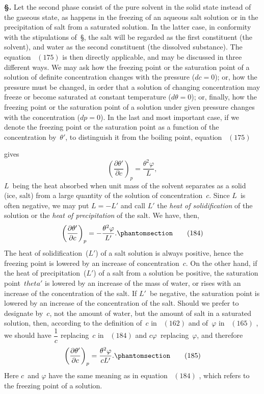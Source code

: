 \documentclass[12pt]{book}[2005/09/16]
\newcommand{\Erratum}[2]{#2}
\newcommand{\Section}[1]{
  \medskip\par\textbf{§\;#1}
  \label{section:#1}
}
\newcommand{\SecRef}[2][§\;]{\hyperref[section:#2.]{{\upshape #1#2}}}
\newcommand{\Tag}[1]{%
  \phantomsection\label{eqn:#1}\tag*{\ensuremath{#1}}%
}
\newcommand{\Eq}[1]{%
  \hyperref[eqn:#1]{\ensuremath{#1}}%
}
\newcommand{\PageSep}[1]{\ignorespaces}
\newcommand{\dd}{\partial}
\begin{document}
\Section{227.} Let the second phase consist of the pure solvent
in the solid state instead of the gaseous state, as happens
in the freezing of an aqueous salt solution or in the precipitation
of salt from a saturated solution. In the latter
case, in conformity with the stipulations of~\SecRef{220}, the salt
will be regarded as the first constituent (the solvent), and
water as the second constituent (the dissolved substance).
The equation~\Eq{(175)} is then directly applicable, and may be
discussed in three different ways. We may ask how the
freezing point or the saturation point of a solution of definite
concentration changes with the pressure ($dc = 0$); or, how
the pressure must be changed, in order that a solution of
changing concentration may freeze or become saturated at
constant temperature ($d\theta = 0$); or, finally, how the freezing
point or the saturation point of a solution under given
pressure changes with the concentration ($dp = 0$). In the
last and most important case, if we denote the freezing
point or the saturation point as a function of the concentration
by~$\theta'$, to distinguish it from the boiling point, equation~\Eq{(175)}
gives
\[
\left(\frac{\dd \theta'}{\dd c}\right)_{p} = \frac{\theta^{2} \varphi}{L},
\]
$L$~being the heat absorbed when unit mass of the solvent
%
%
%
separates as a solid (ice, salt) from a large quantity of the
solution of concentration~$c$. Since $L$~is often negative, we
may put $L = -L'$ and call $L'$ the \emph{heat of solidification} of
%
the solution or the \emph{heat of precipitation} of the salt. We
have, then,
\[
\left(\frac{\dd \theta'}{\dd c}\right)_{p} = -\frac{\theta^{2} \varphi}{L'}.
\Tag{(184)}
\]
The heat of solidification~($L'$) of a salt solution is always
positive, hence the freezing point is lowered by an increase
of concentration~$c$. On the other hand, if the heat of precipitation~($L'$)
of a salt from a solution be positive, the
saturation point~$theta'$ is lowered by an increase of the mass
of water, or rises with an increase of the concentration of
\PageSep{202}
the salt. If $L'$~be negative, the saturation point is lowered
by an increase of the concentration of the salt. Should we
prefer to designate by~$c$, not the amount of water, but the
amount of salt in a saturated solution, then, according to
the definition of~$c$ in~\Eq{(162)} and of~$\varphi$ in~\Eq{(165)}, we should
have $\dfrac{1}{c}$ replacing~$c$ in~\Eq{(184)} and $c\Erratum{\phi}{\varphi}$~replacing~$\varphi$, and therefore
\[
\left(\frac{\dd \theta'}{\dd c}\right)_{p} = \frac{\theta^{2} \varphi}{cL'}.
\Tag{(185)}
\]
Here $c$~and $\Erratum{\phi}{\varphi}$ have the same meaning as in equation~\Eq{(184)},
which refers to the freezing point of a solution.
\end{document}
